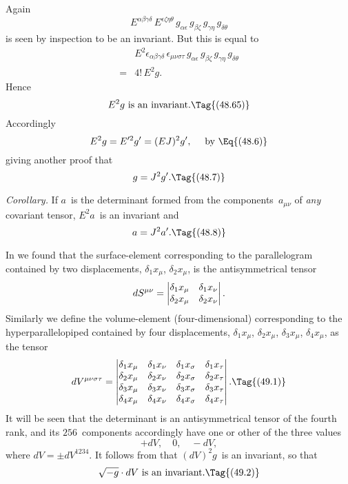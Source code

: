 \documentclass[12pt]{book}
\begin{document}
Again
\[
E^{\alpha\beta\gamma\delta}\, E^{\epsilon\zeta\eta\theta}\,
g_{\alpha\epsilon}\, g_{\beta\zeta}\, g_{\gamma\eta}\, g_{\delta\theta}
\]
is seen by inspection to be an invariant. But this is equal to
\begin{align*}
  &E^{2} \epsilon_{\alpha\beta\gamma\delta}\, \epsilon_{\mu\nu\sigma\tau}\,
  g_{\alpha\epsilon}\, g_{\beta\zeta}\, g_{\gamma\eta}\, g_{\delta\theta} \\
= {} &4!\, E^{2} g.
\end{align*}
Hence
\[
\text{$E^{2} g$ is an invariant.}
\Tag{(48.65)}
\]
Accordingly
\[
E^{2} g = E'^{2} g' = (EJ)^{2} g',\quad\text{ by \Eq{(48.6)}}
\]
giving another proof that
\[
g = J^{2} g'.
\Tag{(48.7)}
\]

\emph{Corollary.} If $a$~is the determinant formed from the components~$a_{\mu\nu}$ of
\emph{any} covariant tensor, $E^{2} a$~is an invariant and
\[
a = J^{2} a'.
\Tag{(48.8)}
\]


In  we found that the surface-element corresponding to the parallelogram
contained by two displacements, $\delta_{1} x_{\mu}$, $\delta_{2} x_{\mu}$, is the antisymmetrical tensor
\[
dS^{\mu\nu} = \left|\begin{array}{@{}cc@{}}
\delta_{1} x_{\mu} & \delta_{1} x_{\nu} \\
\delta_{2} x_{\mu} & \delta_{2} x_{\nu} \\
\end{array}\right|.
\]
Similarly we define the volume-element (four-dimensional) corresponding to
%
the hyperparallelopiped contained by four displacements, $\delta_{1} x_{\mu}$, $\delta_{2} x_{\mu}$, $\delta_{3} x_{\mu}$, $\delta_{4} x_{\mu}$,
as the tensor
\[
dV^{\mu\nu\sigma\tau} = \left|\begin{array}{@{}cccc@{}}
\delta_{1} x_{\mu} & \delta_{1} x_{\nu} & \delta_{1} x_{\sigma} & \delta_{1} x_{\tau} \\
\delta_{2} x_{\mu} & \delta_{2} x_{\nu} & \delta_{2} x_{\sigma} & \delta_{2} x_{\tau} \\
\delta_{3} x_{\mu} & \delta_{3} x_{\nu} & \delta_{3} x_{\sigma} & \delta_{3} x_{\tau} \\
\delta_{4} x_{\mu} & \delta_{4} x_{\nu} & \delta_{4} x_{\sigma} & \delta_{4} x_{\tau} \\
\end{array}\right|.
\Tag{(49.1)}
\]
It will be seen that the determinant is an antisymmetrical tensor of the fourth
rank, and its $256$~components accordingly have one or other of the three values
\[
+dV,\quad 0,\quad -dV,
\]
where $dV = \pm dV^{1234}$. It follows from  that $(dV)^{2} g$~is an invariant, so
that
\[
\text{$\sqrt{-g} \cdot dV$ is an invariant.}
\Tag{(49.2)}
\]
\end{document}
